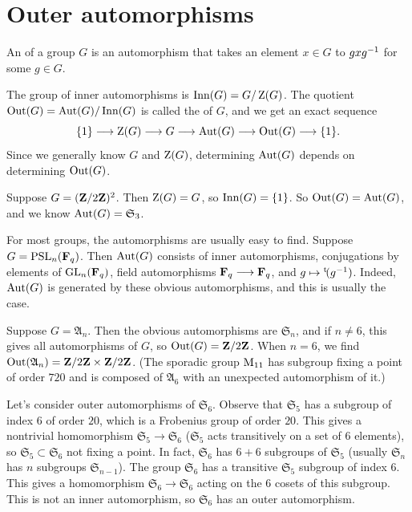 \documentclass[11pt, twoside]{amsart}
\begin{document}
\section{Outer automorphisms}
\begin{definition}
An  of a group $G$ is an automorphism that takes an element $x\in G$ to $gxg^{-1}$ for some $g\in G$.
\end{definition}
The group of inner automorphisms is $\operatorname{Inn}(G) = G / \operatorname{Z}(G)$. The quotient $\operatorname{Out}(G) = \operatorname{Aut}(G)/\operatorname{Inn}(G)$ is called the  of $G$, and we get an exact sequence
$$
\{1\} \longrightarrow \operatorname{Z}(G) \longrightarrow G\longrightarrow \operatorname{Aut}(G) \longrightarrow \operatorname{Out}(G) \longrightarrow \{1\}.
$$
Since we generally know $G$ and $\operatorname{Z}(G)$, determining $\operatorname{Aut}(G)$ depends on determining $\operatorname{Out}(G)$.
\begin{example}
Suppose $G = (\mathbf{Z}/2\mathbf{Z} )^2$. Then $\operatorname{Z}(G) = G$, so $\operatorname{Inn}(G) = \{1\}$. So $\operatorname{Out}(G) = \operatorname{Aut}(G)$, and we know $\operatorname{Aut}(G) = \mathfrak{S}_3$.
\end{example}

For most groups, the automorphisms are usually easy to find. Suppose $G = \operatorname{PSL}_n(\mathbf F_q)$. Then $\operatorname{Aut}(G)$ consists of inner automorphisms, conjugations by elements of $\operatorname{GL}_n(\mathbf F_q)$,  field automorphisms $\mathbf F_q\longrightarrow \mathbf F_q$, and $g\mapsto {}^{\mathrm{t}}\!{(g^{-1})}$. Indeed, $\operatorname{Aut}(G)$ is generated by these obvious automorphisms, and this is usually the case.

Suppose $G= \mathfrak{A}_n$. Then the obvious automorphisms are $\mathfrak{S}_n$, and if $n\ne 6$, this gives all automorphisms of $G$, so $\operatorname{Out}(G) = \mathbf{Z}/2\mathbf{Z} $. When $n=6$, we find $\operatorname{Out}(\mathfrak{A}_n) = \mathbf{Z}/2\mathbf{Z}  \times \mathbf{Z}/2\mathbf{Z} $. (The sporadic group $\operatorname{M}_{11}$ has subgroup fixing a point of order $720$ and is composed of $\mathfrak{A}_6$ with an unexpected automorphism of it.)

Let's consider outer automorphisms of $\mathfrak{S}_6$. Observe that $\mathfrak{S}_5$ has a subgroup of index $6$ of order $20$, which is a Frobenius group of order $20$. This gives a nontrivial homomorphism $\mathfrak{S}_5\longrightarrow \mathfrak{S}_6$ ($\mathfrak{S}_5$ acts transitively on a set of $6$ elements), so $\mathfrak{S}_5\subset \mathfrak{S}_6$ not fixing a point. In fact, $\mathfrak{S}_6$ has $6+6$ subgroups of $\mathfrak{S}_5$ (usually $\mathfrak{S}_n$ has $n$ subgroups $\mathfrak{S}_{n-1}$). The group $\mathfrak{S}_6$ has a transitive $\mathfrak{S}_5$ subgroup of index $6$. This gives a homomorphism $\mathfrak{S}_6\longrightarrow\mathfrak{S}_6$ acting on the $6$ cosets of this subgroup. This is not an inner automorphism, so $\mathfrak{S}_6$ has an outer automorphism. 
\end{document}
